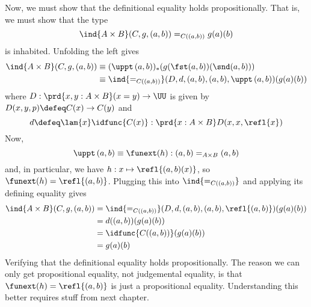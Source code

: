 Now, we must show that the definitional equality holds propositionally.  That
is, we must show that the type
\[
\ind{A \times B}(C, g, (a, b)) =_{C((a, b))} g(a)(b)
\]
is inhabited.  Unfolding the left gives
\begin{align*}
\ind{A \times B}(C, g, (a, b))
&\equiv
(\uppt\, (a, b))_{*}(g(\fst (a, b))(\snd (a, b)))
\\&\equiv
\ind{=_{C((a, b))}}(D, d, (a, b), (a, b), \uppt\, (a, b))(g(a)(b))
\end{align*}
where $D : \prd{x, y : A \times B} (x = y) \to \UU$ is given by $D(x, y, p)
\defeq C(x) \to C(y)$ and
\[
d \defeq \lam{x}\idfunc{C(x)} : \prd{x:A\times B} D(x, x, \refl{x})
\]
Now,
\[
\uppt\, (a, b) \equiv \funext(h) : (a, b) =_{A \times B} (a, b)
\]
and, in particular, we have $h : x \mapsto \refl{(a, b)(x)}$, so $\funext(h) =
\refl{(a, b)}$.  Plugging this into $\ind{=_{C((a, b))}}$ and applying its
defining equality gives
\begin{align*}
\ind{A \times B}(C, g, (a, b))
&=
\ind{=_{C((a, b))}}(D, d, (a, b), (a, b), \refl{(a, b)})(g(a)(b))
\\&=
d((a, b))(g(a)(b))
\\&=
\idfunc{C((a, b))}(g(a)(b))
\\&=
g(a)(b)
\end{align*}
Verifying that the definitional equality holds propositionally.  The reason we
can only get propositional equality, not judgemental equality, is that
$\funext(h) = \refl{(a, b)}$ is just a propositional equality.  Understanding
this better requires stuff from next chapter. 
